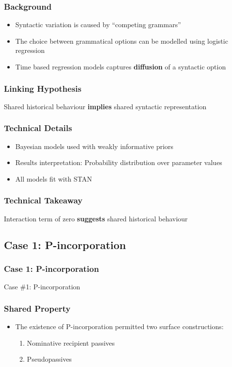 \documentclass{beamer}
\begin{document}
\begin{frame}
	\frametitle{Background}
	\begin{itemize}
		\item Syntactic variation is caused by ``competing grammars'' \citep{Kroch.1989}
		\item The choice between grammatical options can be modelled using logistic regression
		\item Time based regression models captures \textbf{diffusion} of a syntactic option
	\end{itemize}
\end{frame}

\begin{frame}
	\frametitle{Linking Hypothesis}
	\vfill
	\Large
	Shared historical behaviour \textbf{implies} shared syntactic representation
	\vfill
\end{frame}

\begin{frame}
	\frametitle{Technical Details}
	\begin{itemize}
		\item Bayesian models used with weakly informative priors
		\item Results interpretation: Probability distribution over parameter values
		\item All models fit with STAN
	\end{itemize}
\end{frame}

\begin{frame}
	\frametitle{Technical Takeaway}
	\vfill
	Interaction term of zero \textbf{suggests} shared historical behaviour
	\vfill
\end{frame}
\subsection{Case 1: P-incorporation}
\begin{frame}
	\frametitle{Case 1: P-incorporation}
	\vfill
	\Large
	Case \#1: P-incorporation
	\vfill
\end{frame}
\begin{frame}
	\frametitle{Shared Property}
	\begin{itemize}
		\item The existence of P-incorporation permitted two surface constructions:
			\begin{enumerate}
				\item Nominative recipient passives
				\item Pseudopassives
			\end{enumerate}
	\end{itemize}
\end{frame}
\end{document}
